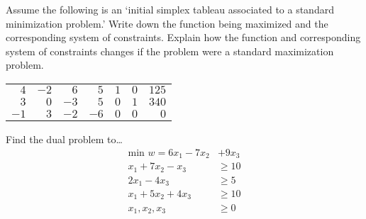\documentclass[11pt,letterpaper]{article}
\begin{document}
 Assume the following is an `initial simplex tableau associated to a standard minimization problem.' Write down the function being maximized and the corresponding system of constraints. Explain how the function and corresponding system of constraints changes if the problem were a standard maximization problem.
	\begin{table}[!ht]
	\centering
	\begin{tabular}{rrrrrr|r}
	$4$ & $-2$ & $6$ & $5$ & $1$ & $0$ & $125$ \\
	$3$ & $0$ & $-3$ & $5$ & $0$ & $1$ & $340$ \\ \hline
	$-1$ & $3$ & $-2$ & $-6$ & $0$ & $0$ & $0$ 
	\end{tabular}
	\end{table}



\newpage



 Find the dual problem to\dots
	\[
	\begin{aligned}
	\text{min } w= 6x_1 - 7x_2 &+ 9x_3 \\
	x_1 + 7x_2 - x_3&\geq 10 \\
	2x_1 - 4x_3&\geq 5 \\
	x_1 + 5x_2 + 4x_3&\geq 10 \\
	x_1, x_2, x_3&\geq 0 
	\end{aligned}
	\]
\end{document}
